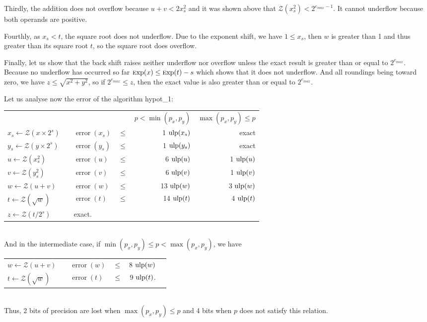 \documentclass[12pt]{amsart}
\def\ulp{{\rm ulp}}
\def\Exp{{\rm \textsc exp}}
\def\Z{{\mathcal Z}}
\DeclareMathOperator{\error}{error}
\begin{document}
Thirdly, the addition does not overflow because $u + v < 2 x_s^2$ and it was
shown above that $\Z(x_s^2) < 2^{e_{max} - 1}$. It cannot underflow because
both operands are positive.

Fourthly, as $x_s < t$, the square root does not underflow. Due to the
exponent shift, we have $1 \leq x_s$, then $w$ is greater than 1 and thus
greater than its square root $t$, so the square root does overflow.

Finally, let us show that the back shift raises neither underflow nor overflow
unless the exact result is greater than or equal to $2^{e_{max}}$. Because no
underflow has occurred so far $\Exp(x) \leq \Exp(t) - s$ which shows that it
does not underflow. And all roundings being toward zero, we have $z \leq
\sqrt{x^2 + y^2}$, so if $2^{e_{max}} \leq z$, then the exact value is also
greater than or equal to $2^{e_{max}}$.

Let us analyse now the error of the algorithm hypot\_1:\\
\begin{tabular}{l p{2em} l c r | r}
  & & & & $p < \min(p_x, p_y)$ & $\max(p_x, p_y) \leq p$\\
  $x_s \leftarrow \Z(x\times 2^s)$ & & $\error(x_s)$ & $\leq$ &
  1 $\ulp(x_s)$ &
  exact\\
  $y_s \leftarrow \Z(y\times 2^s)$ & & $\error(y_s)$ & $\leq$ &
  1 $\ulp(y_s)$ &
  exact\\
  $u \leftarrow \Z(x_s^2)$ & & $\error(u)$ & $\leq$ &
  6 $\ulp(u)$ &
  1 $\ulp(u)$\\
  $v \leftarrow \Z(y_s^2)$ & & $\error(v)$ & $\leq$ &
  6 $\ulp(v)$ &
  1 $\ulp(v)$\\
  $w \leftarrow \Z(u+v)$ & & $\error(w)$ & $\leq$ &
  13 $\ulp(w)$ &
  3 $\ulp(w)$\\
  $t \leftarrow \Z(\sqrt{w})$ & & $\error(t)$ & $\leq$ &
  14 $\ulp(t)$ &
  4 $\ulp(t)$\\
  $z \leftarrow \Z(t/2^s)$& & exact.\\
\end{tabular}\\
And in the intermediate case, if $\min(p_x,p_y) \leq p < \max(p_x,p_y)$, we
have\\
\begin{tabular}{l p{2em} l c r l}
  $w \leftarrow \Z(u+v)$ & &
  $\error(w)$ & $\leq$ & 8 $\ulp(w)$\\
  $t \leftarrow \Z(\sqrt{w})$ & &
  $\error(t)$ & $\leq$ & 9 $\ulp(t)$.\\
\end{tabular}\\
Thus, 2 bits of precision are lost when $\max(p_x, p_y) \leq p$ and 4 bits
when $p$ does not satisfy this relation.
\end{document}

